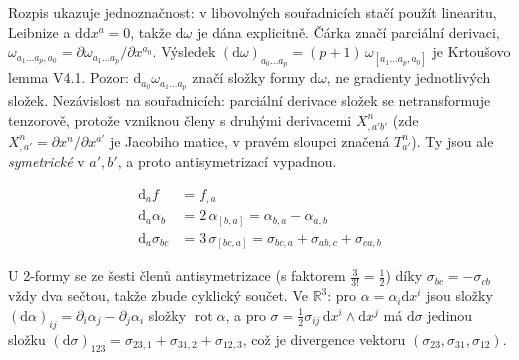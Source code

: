 \begin{vysvetleni}
Rozpis ukazuje jednoznačnost: v libovolných souřadnicích stačí použít linearitu, Leibnize a $\mathrm{d}\mathrm{d}x^a=0$, takže $\mathrm{d}\omega$ je dána explicitně. Čárka značí parciální derivaci, $\omega_{a_1\dots a_p,a_0}=\partial\omega_{a_1\dots a_p}/\partial x^{a_0}$. Výsledek $(\mathrm{d}\omega)_{a_0\dots a_p}=(p+1)\,\omega_{[a_1\dots a_p,a_0]}$ je Krtoušovo lemma V4.1.
Pozor: $\mathrm{d}_{a_0}\omega_{a_1\dots a_p}$ značí složky formy $\mathrm{d}\omega$, ne gradienty jednotlivých složek.
Nezávislost na souřadnicích: parciální derivace složek se netransformuje tenzorově, protože vzniknou členy s druhými derivacemi $X^n_{,a'b'}$ (zde $X^n_{,a'}=\partial x^n/\partial x^{a'}$ je Jacobiho matice, v pravém sloupci značená $T^n_{a'}$). Ty jsou ale \emph{symetrické} v $a',b'$, a proto antisymetrizací vypadnou.
\end{vysvetleni}

\begin{priklad}[Př.]
\begin{align*}
  \mathrm{d}_af &= f_{,a} \\
  \mathrm{d}_a\alpha_b &= 2\,\alpha_{[b,a]} = \alpha_{b,a} - \alpha_{a,b} \\
  \mathrm{d}_a\sigma_{bc} &= 3\,\sigma_{[bc,a]} = \sigma_{bc,a} + \sigma_{ab,c} + \sigma_{ca,b}
\end{align*}
\end{priklad}

\begin{vysvetleni}[K příkladům]
U 2-formy se ze šesti členů antisymetrizace (s faktorem $\tfrac{3}{3!}=\tfrac12$) díky $\sigma_{bc}=-\sigma_{cb}$ vždy dva sečtou, takže zbude cyklický součet. Ve $\mathbb{R}^3$: pro $\alpha=\alpha_i\mathrm{d}x^i$ jsou složky $(\mathrm{d}\alpha)_{ij}=\partial_i\alpha_j-\partial_j\alpha_i$ složky $\operatorname{rot}\alpha$, a pro $\sigma=\tfrac12\sigma_{ij}\,\mathrm{d}x^i\wedge\mathrm{d}x^j$ má $\mathrm{d}\sigma$ jedinou složku $(\mathrm{d}\sigma)_{123}=\sigma_{23,1}+\sigma_{31,2}+\sigma_{12,3}$, což je divergence vektoru $(\sigma_{23},\sigma_{31},\sigma_{12})$.
\end{vysvetleni}


